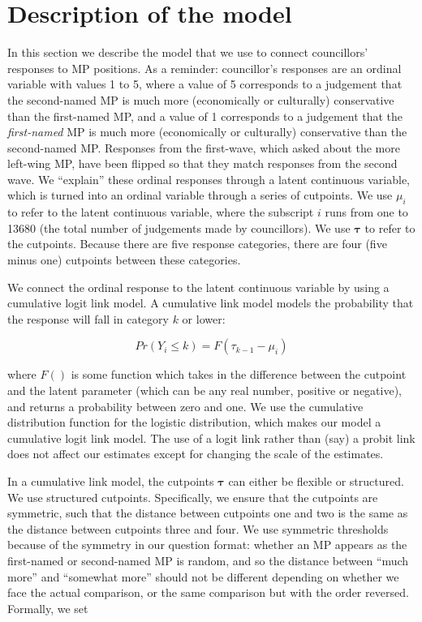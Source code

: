 \documentclass[
]{article}
\begin{document}
\section{Description of the model}\label{description-of-the-model}

In this section we describe the model that we use to connect
councillors' responses to MP positions. As a reminder: councillor's
responses are an ordinal variable with values 1 to 5, where a value of 5
corresponds to a judgement that the second-named MP is much more
(economically or culturally) conservative than the first-named MP, and a
value of 1 corresponds to a judgement that the \emph{first-named} MP is
much more (economically or culturally) conservative than the
second-named MP. Responses from the first-wave, which asked about the
more left-wing MP, have been flipped so that they match responses from
the second wave. We ``explain'' these ordinal responses through a latent
continuous variable, which is turned into an ordinal variable through a
series of cutpoints. We use \(\mu_i\) to refer to the latent continuous
variable, where the subscript \(i\) runs from one to 13680 (the total
number of judgements made by councillors). We use \(\symbf{\tau}\) to
refer to the cutpoints. Because there are five response categories,
there are four (five minus one) cutpoints between these categories.

We connect the ordinal response to the latent continuous variable by
using a cumulative logit link model. A cumulative link model models the
probability that the response will fall in category \(k\) or lower:

\[
Pr(Y_i \le k) = F(\tau_{k - 1} - \mu_i)
\]

where \(F()\) is some function which takes in the difference between the
cutpoint and the latent parameter (which can be any real number,
positive or negative), and returns a probability between zero and one.
We use the cumulative distribution function for the logistic
distribution, which makes our model a cumulative logit link model. The
use of a logit link rather than (say) a probit link does not affect our
estimates except for changing the scale of the estimates.

In a cumulative link model, the cutpoints \(\symbf{\tau}\) can either be
flexible or structured. We use structured cutpoints. Specifically, we
ensure that the cutpoints are symmetric, such that the distance between
cutpoints one and two is the same as the distance between cutpoints
three and four. We use symmetric thresholds because of the symmetry in
our question format: whether an MP appears as the first-named or
second-named MP is random, and so the distance between ``much more'' and
``somewhat more'' should not be different depending on whether we face
the actual comparison, or the same comparison but with the order
reversed. Formally, we set
\end{document}
